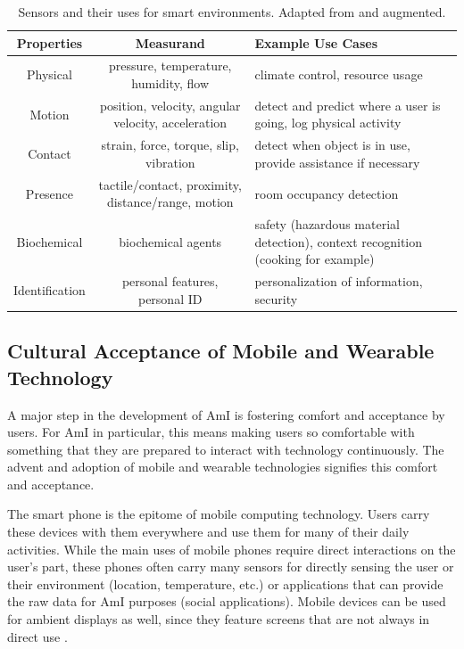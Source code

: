 \documentclass{article}
\begin{document}
\begin{table}[h]
  \centering
  \begin{tabular}{| c | c | p{7cm} |}
  \hline
  Properties     & Measurand                                          & Example Use Cases \\
  \hline\hline
  Physical       & pressure, temperature, humidity, flow              & climate control, resource usage \\
  \hline
  Motion         & position, velocity, angular velocity, acceleration & detect and predict where a user is going, log physical activity \\
  \hline
  Contact        & strain, force, torque, slip, vibration             & detect when object is in use, provide assistance if necessary \\
  \hline
  Presence       & tactile/contact, proximity, distance/range, motion & room occupancy detection \\
  \hline
  Biochemical    & biochemical agents                                 & safety (hazardous material detection), context recognition (cooking for example)\\
  \hline
  Identification & personal features, personal ID                     & personalization of information, security\\
  \hline
  \end{tabular}
  \caption{Sensors and their uses for smart environments. Adapted from \cite{Cook:2007:SOE:1225943.1226005} and augmented.}
  \label{tab:amisensors}
\end{table}


%
\subsection{Cultural Acceptance of Mobile and Wearable Technology}
A major step in the development of AmI is fostering comfort and acceptance by users. For AmI in particular, this means making users so comfortable with something that they are prepared to interact with technology continuously. The advent and adoption of mobile and wearable technologies signifies this comfort and acceptance.

The smart phone is the epitome of mobile computing technology. Users carry these devices with them everywhere and use them for many of their daily activities. While the main uses of mobile phones require direct interactions on the user's part, these phones often carry many sensors for directly sensing the user or their environment (location, temperature, etc.) or applications that can provide the raw data for AmI purposes (social applications). Mobile devices can be used for ambient displays as well, since they feature screens that are not always in direct use \cite{Cook2009277} \cite{Cook:2007:SOE:1225943.1226005} \cite{Sadri:2011:AIS:1978802.1978815}.
\end{document}
